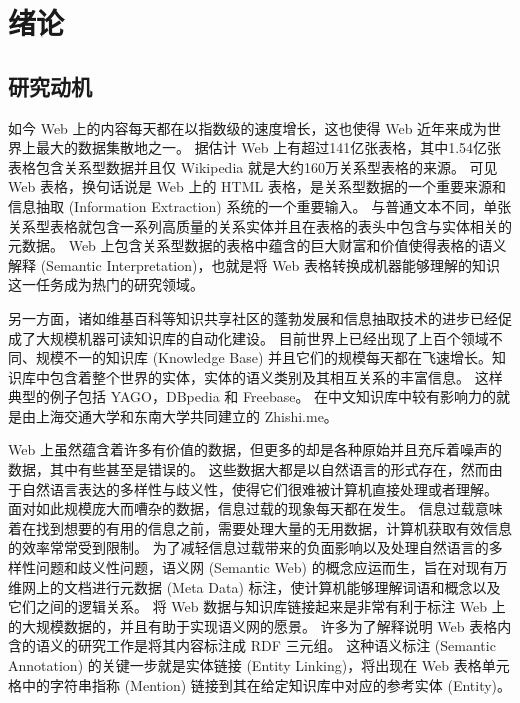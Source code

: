 \chapter{绪论}

\section{研究动机}
如今 Web 上的内容每天都在以指数级的速度增长\cite{limaye2010annotating}，这也使得 Web 近年来成为世界上最大的数据集散地之一。
据估计 Web 上有超过141亿张表格，其中1.54亿张表格包含关系型数据并且仅 Wikipedia 就是大约160万关系型表格的来源。
可见Web 表格，换句话说是 Web 上的 HTML 表格，是关系型数据的一个重要来源和信息抽取 (Information Extraction) 系统的一个重要输入。
与普通文本不同，单张关系型表格就包含一系列高质量的关系实体并且在表格的表头中包含与实体相关的元数据。
Web 上包含关系型数据的表格中蕴含的巨大财富和价值使得表格的语义解释 (Semantic Interpretation)，也就是将 Web 表格转换成机器能够理解的知识这一任务成为热门的研究领域。\par

另一方面，诸如维基百科等知识共享社区的蓬勃发展和信息抽取技术的进步已经促成了大规模机器可读知识库的自动化建设。
目前世界上已经出现了上百个领域不同、规模不一的知识库 (Knowledge Base) 并且它们的规模每天都在飞速增长。知识库中包含着整个世界的实体，实体的语义类别及其相互关系的丰富信息。
这样典型的例子包括 YAGO\cite{suchanek2007yago}，DBpedia\cite{auer2007dbpedia} 和 Freebase\cite{bollacker2008freebase}。
在中文知识库中较有影响力的就是由上海交通大学和东南大学共同建立的 Zhishi.me\cite{niu2011zhishi}。\par

Web 上虽然蕴含着许多有价值的数据，但更多的却是各种原始并且充斥着噪声的数据，其中有些甚至是错误的。
这些数据大都是以自然语言的形式存在，然而由于自然语言表达的多样性与歧义性，使得它们很难被计算机直接处理或者理解。
面对如此规模庞大而嘈杂的数据，信息过载的现象每天都在发生。
信息过载意味着在找到想要的有用的信息之前，需要处理大量的无用数据，计算机获取有效信息的效率常常受到限制。
为了减轻信息过载带来的负面影响以及处理自然语言的多样性问题和歧义性问题，语义网 (Semantic Web) 的概念应运而生，旨在对现有万维网上的文档进行元数据 (Meta Data) 标注，使计算机能够理解词语和概念以及它们之间的逻辑关系。
将 Web 数据与知识库链接起来是非常有利于标注 Web 上的大规模数据的，并且有助于实现语义网的愿景\cite{berners2001semantic}。
许多为了解释说明 Web 表格内含的语义的研究工作\cite{limaye2010annotating}\cite{hignette2009fuzzy}\cite{mulwad2013semantic}\cite{munoz2014using}\cite{syed2010exploiting}\cite{venetis2011recovering}是将其内容标注成 RDF 三元组。
这种语义标注 (Semantic Annotation) 的关键一步就是实体链接 (Entity Linking)，将出现在 Web 表格单元格中的字符串指称 (Mention) 链接到其在给定知识库中对应的参考实体 (Entity)。\par

